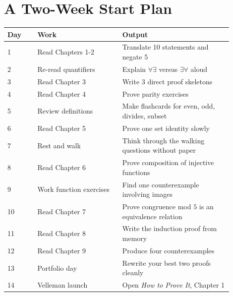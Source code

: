 \documentclass[11pt]{article}
\begin{document}
\section{A Two-Week Start Plan}

\begin{longtable}{p{0.12\linewidth}p{0.34\linewidth}p{0.44\linewidth}}
\toprule
Day & Work & Output \\
\midrule
1 & Read Chapters 1-2 & Translate 10 statements and negate 5 \\
2 & Re-read quantifiers & Explain $\forall\exists$ versus $\exists\forall$ aloud \\
3 & Read Chapter 3 & Write 3 direct proof skeletons \\
4 & Read Chapter 4 & Prove parity exercises \\
5 & Review definitions & Make flashcards for even, odd, divides, subset \\
6 & Read Chapter 5 & Prove one set identity slowly \\
7 & Rest and walk & Think through the walking questions without paper \\
8 & Read Chapter 6 & Prove composition of injective functions \\
9 & Work function exercises & Find one counterexample involving images \\
10 & Read Chapter 7 & Prove congruence mod $5$ is an equivalence relation \\
11 & Read Chapter 8 & Write the induction proof from memory \\
12 & Read Chapter 9 & Produce four counterexamples \\
13 & Portfolio day & Rewrite your best two proofs cleanly \\
14 & Velleman launch & Open \emph{How to Prove It}, Chapter 1 \\
\bottomrule
\end{longtable}
\end{document}
